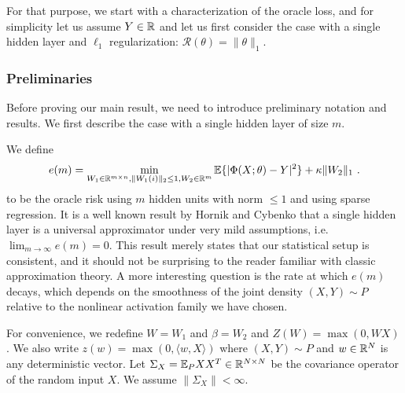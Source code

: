 For that purpose, we start with a characterization of the oracle loss, and for simplicity let us assume 
$Y \in {\mathbb{R}}$ and let us first consider the case with a single hidden layer and $\ell_1$ regularization:
$\mathcal{R}(\theta) = \| \theta\|_1$.

\subsubsection{Preliminaries}
 Before proving our main result, we need to introduce  preliminary notation and results. 
We first describe the case with a single hidden layer of size $m$. 

We define
\begin{equation}
\label{bla2}
e(m) = \min_{W_1 \in {\mathbb{R}}^{m \times n}, \|W_1(i) \|_2 \leq 1, W_2 \in {\mathbb{R}}^m} {\mathbb{E}}\{ | \Phi(X; \theta) - Y|^2 \} + \kappa  \| W_2 \|_1~.
\end{equation}
to be the oracle risk using $m$ hidden units with norm $\leq 1$ and using sparse regression. 
It is a well known result by Hornik and Cybenko that a single hidden layer 
is a universal approximator under very mild assumptions, i.e. $\lim_{m \to \infty} e(m) = 0$.
This result merely states that our statistical setup is consistent, and it should not be 
surprising to the reader familiar with classic approximation theory.
 A more interesting question is the rate at which $e(m)$ decays, which depends 
on the smoothness of the joint density $(X, Y) \sim P$ relative to the nonlinear activation 
family we have chosen.

For convenience, we redefine $W = W_1$ and $\beta = W_2$ and
 $Z(W) = \max(0, W X)$. We also write $z(w) = \max(0, \langle w, X \rangle)$ where $(X, Y) \sim P$ and $w \in {\mathbb{R}}^N$ is any deterministic vector.
Let $\Sigma_X = {\mathbb{E}}_{P} XX^T \in {\mathbb{R}}^{N \times N}$ be the covariance operator of the random input $X$. We assume $\| \Sigma_X \| < \infty$. 

